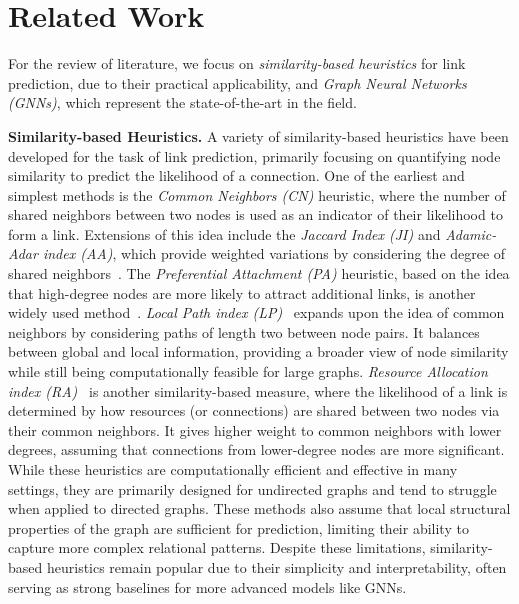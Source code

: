 \documentclass{article}
\begin{document}
\section{Related Work}\label{sec:literature}
For the review of literature, we focus on \emph{similarity-based heuristics} for link prediction, due to their practical applicability, and \emph{Graph Neural Networks (GNNs)}, which represent the state-of-the-art in the field. 

\textbf{Similarity-based Heuristics.} A variety of similarity-based heuristics have been developed for the task of link prediction, primarily focusing on quantifying node similarity to predict the likelihood of a connection. One of the earliest and simplest methods is the \emph{Common Neighbors (CN)} heuristic, where the number of shared neighbors between two nodes is used as an indicator of their likelihood to form a link. Extensions of this idea include the \emph{Jaccard Index (JI)} and \emph{Adamic-Adar index (AA)}, which provide weighted variations by considering the degree of shared neighbors~\cite{adamic2003friends, liben2007link}. The \emph{Preferential Attachment (PA)} heuristic, based on the idea that high-degree nodes are more likely to attract additional links, is another widely used method~\cite{newman2001clustering}. \emph{Local Path index (LP)}~\citep{lu2009similarity} expands upon the idea of common neighbors by considering paths of length two between node pairs. It balances between global and local information, providing a broader view of node similarity while still being computationally feasible for large graphs. \emph{Resource Allocation index (RA)}~\citep{zhou2009predicting} is another similarity-based measure, where the likelihood of a link is determined by how resources (or connections) are shared between two nodes via their common neighbors. It gives higher weight to common neighbors with lower degrees, assuming that connections from lower-degree nodes are more significant. While these heuristics are computationally efficient and effective in many settings, they are primarily designed for undirected graphs and tend to struggle when applied to directed graphs. These methods also assume that local structural properties of the graph are sufficient for prediction, limiting their ability to capture more complex relational patterns. Despite these limitations, similarity-based heuristics remain popular due to their simplicity and interpretability, often serving as strong baselines for more advanced models like GNNs. 
\end{document}
